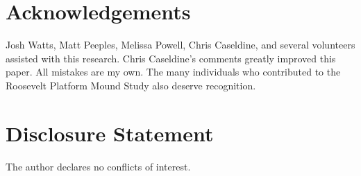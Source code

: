 \documentclass[]{interact}
\theoremstyle{plain}%
\theoremstyle{definition}
\theoremstyle{remark}
\begin{document}
\hypertarget{acknowledgements}{%
\section*{Acknowledgements}\label{acknowledgements}}

Josh Watts, Matt Peeples, Melissa Powell, Chris Caseldine, and several
volunteers assisted with this research. Chris Caseldine's comments
greatly improved this paper. All mistakes are my own. The many
individuals who contributed to the Roosevelt Platform Mound Study also
deserve recognition.

\hypertarget{disclosure-statement}{%
\section*{Disclosure Statement}\label{disclosure-statement}}

The author declares no conflicts of interest.



\end{document}
